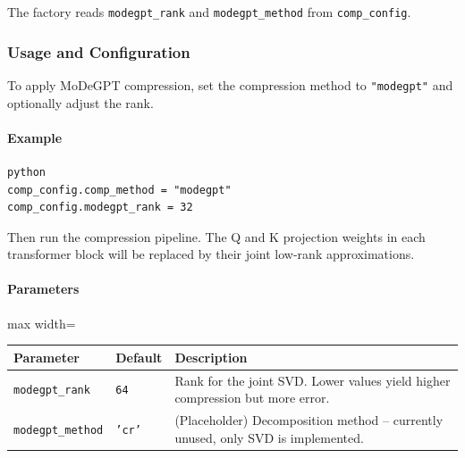 The factory reads \texttt{modegpt\_rank} and \texttt{modegpt\_method} from \texttt{comp\_config}.


\subsubsection*{Usage and Configuration}

To apply MoDeGPT compression, set the compression method to \texttt{"modegpt"} and optionally adjust the rank.

\paragraph{Example}

\vspace{0.5em}
\begin{mdframed}[backgroundcolor=codebg, linecolor=codeframe, linewidth=1pt, roundcorner=4pt, innerleftmargin=2pt, innerrightmargin=5pt, innertopmargin=5pt, innerbottommargin=5pt]
\begin{lstlisting}
python
comp_config.comp_method = "modegpt"
comp_config.modegpt_rank = 32
\end{lstlisting}
\end{mdframed}
\vspace{0.5em}

Then run the compression pipeline. The Q and K projection weights in each transformer block will be replaced by their joint low-rank approximations.

\paragraph{Parameters}

\begin{center}
\begin{adjustbox}{max width=\columnwidth}
\renewcommand{\arraystretch}{1.2}
\begin{tabular}{lll}
\toprule
Parameter & Default & Description \\
\midrule
\texttt{modegpt\_rank} & \texttt{64} & Rank for the joint SVD. Lower values yield higher compression but more error. \\
\texttt{modegpt\_method} & \texttt{'cr'} & (Placeholder) Decomposition method -- currently unused, only SVD is implemented. \\

\bottomrule
\end{tabular}
\end{adjustbox}
\end{center}

